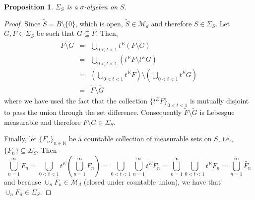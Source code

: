 \documentclass{article}
\theoremstyle{theorem}
\newtheorem{proposition}[theorem]{Proposition}
\theoremstyle{remark}
\begin{document}
\begin{proposition}
$\Sigma_S$ is a $\sigma$-algebra on $S$.
\end{proposition}








\begin{proof}
Since $\widetilde S=B\setminus\{0\}$, which is open, $\widetilde S\in \mathcal{M}_d$ and therefore $S\in \Sigma_S$. Let $G, F\in \Sigma_S$ be such that $G\subseteq F$. Then,
\begin{eqnarray*}
\widetilde{F\setminus G}&=&\bigcup_{0<t<1}t^E\left(F\setminus G\right)\\
&=&\bigcup_{0<t<1}\left(t^EF\setminus t^E G\right)\\
&=&\left(\bigcup_{0<t<1}t^E F\right)\setminus\left(\bigcup_{0<t<1}t^E G\right)\\
&=&\widetilde F\setminus \widetilde G
\end{eqnarray*}
where we have used the fact that the collection $\{t^E F\}_{0<t<1}$ is mutually disjoint to pass the union through the set difference. Consequently $\widetilde F\setminus \tilde{G}$ is Lebesgue measurable and therefore $F\setminus G\in \Sigma_S$. 

Finally, let $\{F_n\}_{n\in\mathbb{N}}$ be a countable collection of measurable sets on $S$, i.e., $\{F_n\}\subseteq \Sigma_S$. Then
\begin{equation*}
    \widetilde{\bigcup_{n=1}^\infty F_n}= \bigcup_{0<t<1} t^E \left(\bigcup_{n=1}^\infty F_n\right)= \bigcup_{0 <t < 1}  \bigcup_{n=1}^\infty  t^E F_n =\bigcup_{n=1}^\infty \bigcup_{0 <t < 1}  t^E F_n =\bigcup_{n=1}^\infty \widetilde{F_n} 
\end{equation*}
and because $\cup_n \widetilde{F_n}\in \mathcal{M}_d$ (closed under countable union), we have that $\cup_n F_n\in \Sigma_S$. 
\end{proof}

 
\end{document}
